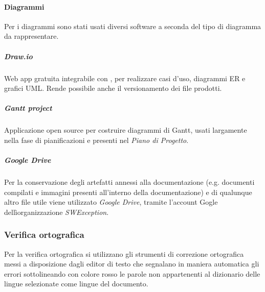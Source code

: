 \paragraph{Diagrammi}
Per i diagrammi sono stati usati diversi software a seconda del tipo di diagramma da rappresentare.
\subparagraph{\textit{Draw.io}}
Web app gratuita integrabile con , per realizzare casi d'uso, diagrammi ER e grafici UML. Rende possibile anche il versionamento dei file prodotti.
\subparagraph{\textit{Gantt project}}
Applicazione open source per costruire diagrammi di Gantt, usati largamente nella fase di pianificazioni e presenti nel \textit{Piano di Progetto}.
\subparagraph{\textit{Google Drive}}
Per la conservazione degli artefatti annessi alla documentazione (e.g. documenti compilati e immagini presenti all'interno della documentazione) e di qualunque altro file utile viene utilizzato \textit{Google Drive}, tramite l'account Gogle dellìorganizzazione \textit{SWException}. 

\subsubsection{Verifica ortografica}
Per la verifica ortografica si utilizzano gli strumenti di correzione ortografica messi a disposizione dagli editor di testo che segnalano in maniera automatica gli errori sottolineando con colore rosso le parole non appartenenti al dizionario delle lingue selezionate come lingue del documento.
